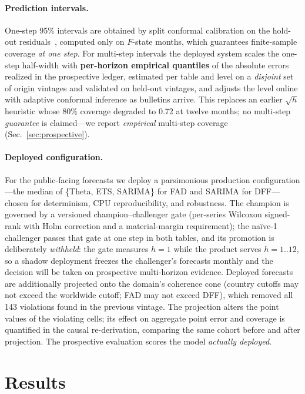 \documentclass[runningheads]{llncs}
\begin{document}
\paragraph{Prediction intervals.} One-step 95\% intervals are obtained by split
conformal calibration on the hold-out residuals~\cite{vovk2005}, computed only on
$F$-state months, which guarantees finite-sample coverage \emph{at one step}. For
multi-step intervals the deployed system scales the one-step half-width with
\textbf{per-horizon empirical quantiles} of the absolute errors realized in the
prospective ledger, estimated per table and level on a \emph{disjoint} set of
origin vintages and validated on held-out vintages, and adjusts the level online
with adaptive conformal inference as bulletins arrive. This replaces an earlier
$\sqrt{h}$ heuristic whose 80\% coverage degraded to 0.72 at twelve months; no
multi-step \emph{guarantee} is claimed---we report \emph{empirical} multi-step
coverage (Sec.~\ref{sec:prospective}).

\paragraph{Deployed configuration.} For the public-facing forecasts we deploy a
parsimonious production configuration---the median of \{Theta, ETS, SARIMA\} for FAD
and SARIMA for DFF---chosen for determinism, CPU reproducibility, and robustness.
The champion is governed by a versioned champion--challenger gate
(per-series Wilcoxon signed-rank with Holm correction and a material-margin
requirement); the naïve-1 challenger passes that gate at one step in both tables,
and its promotion is deliberately \emph{withheld}: the gate measures $h=1$ while
the product serves $h=1..12$, so a shadow deployment freezes the challenger's
forecasts monthly and the decision will be taken on prospective multi-horizon
evidence. Deployed forecasts are additionally projected onto the domain's coherence
cone (country cutoffs may not exceed the worldwide cutoff; FAD may not exceed DFF),
which removed all 143 violations found in the previous vintage. The projection alters
the point values of the violating cells; its effect on aggregate point error and
coverage is quantified in the causal re-derivation, comparing the same cohort before
and after projection. The prospective evaluation scores the model \emph{actually deployed}.

\section{Results}
\label{sec:results}
\end{document}
